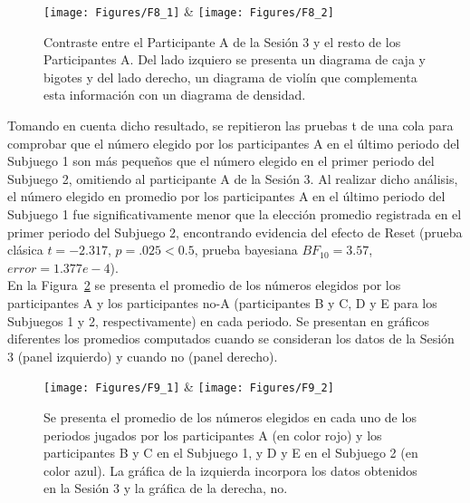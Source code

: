 \begin{figure}[hp]
\centering
\texttt{[image: Figures/F8\_1]} & \texttt{[image: Figures/F8\_2]} 
\decoRule
\caption[Participante atípico: Comparando el desempeño del Participante A de la Sesión 3]{Contraste entre el Participante A de la Sesión 3 y el resto de los Participantes A. Del lado izquiero se presenta un diagrama de caja y bigotes y del lado derecho, un diagrama de violín que complementa esta información con un diagrama de densidad.}
\label{fig:Boxplot}
\end{figure}  

Tomando en cuenta dicho resultado, se repitieron las pruebas t de una cola para comprobar que el número elegido por los participantes A en el último periodo del Subjuego 1 son más pequeños que el número elegido en el primer periodo del Subjuego 2, omitiendo al participante A de la Sesión 3. Al realizar dicho análisis, el número elegido en promedio por los participantes A en el último periodo del Subjuego 1 fue significativamente menor que la elección promedio registrada en el primer periodo del Subjuego 2, encontrando evidencia del efecto de Reset (prueba clásica $t = -2.317$, $p = .025 < 0.5$, prueba bayesiana $BF_{10} = 3.57$, $error = 1.377e-4$).\\

En la Figura~\ref{fig:ParticipantesA_promedio} se presenta el promedio de los números elegidos por los participantes A y los participantes no-A (participantes B y C, D y E para los Subjuegos 1 y 2, respectivamente) en cada periodo. Se presentan en gráficos diferentes los promedios computados cuando se consideran los datos de la Sesión 3 (panel izquierdo) y cuando no (panel derecho).\\
  
\begin{figure}[h]
\centering
\texttt{[image: Figures/F9\_1]} & \texttt{[image: Figures/F9\_2]} 
\decoRule
\caption[Promedio de los números elegidos por los participantes A y no-A en cada uno de los periodos jugados]{Se presenta el promedio de los números elegidos en cada uno de los periodos jugados por los participantes A (en color rojo) y los participantes B y C en el Subjuego 1, y D y E en el Subjuego 2 (en color azul). La gráfica de la izquierda incorpora los datos obtenidos en la Sesión 3 y la gráfica de la derecha, no.}
\label{fig:ParticipantesA_promedio}
\end{figure}  

